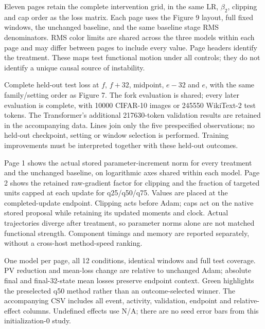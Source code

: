 \caption{Eleven pages retain the complete intervention grid, in the same LR, $\beta_2$, clipping and cap order as the loss matrix. Each page uses the Figure 9 layout, full fixed windows, the unchanged baseline, and the same baseline stage RMS denominators. RMS color limits are shared across the three models within each page and may differ between pages to include every value. Page headers identify the treatment. These maps test functional motion under all controls; they do not identify a unique causal source of instability.}

\caption{Complete held-out test loss at $f$, $f+32$, midpoint, $e-32$ and $e$, with the same family/setting order as Figure 7. The fork evaluation is shared; every later evaluation is complete, with 10000 CIFAR-10 images or 245550 WikiText-2 test tokens. The Transformer's additional 217630-token validation results are retained in the accompanying data. Lines join only the five prespecified observations; no held-out checkpoint, setting or window selection is performed. Training improvements must be interpreted together with these held-out outcomes.}

\caption{Page 1 shows the actual stored parameter-increment norm for every treatment and the unchanged baseline, on logarithmic axes shared within each model. Page 2 shows the retained raw-gradient factor for clipping and the fraction of targeted units capped at each update for q25/q50/q75. Values are placed at the completed-update endpoint. Clipping acts before Adam; caps act on the native stored proposal while retaining its updated moments and clock. Actual trajectories diverge after treatment, so parameter norms alone are not matched functional strength. Component timings and memory are reported separately, without a cross-host method-speed ranking.}

\caption{One model per page, all 12 conditions, identical windows and full test coverage. PV reduction and mean-loss change are relative to unchanged Adam; absolute final and final-32-state mean losses preserve endpoint context. Green highlights the preselected q50 method rather than an outcome-selected winner. The accompanying CSV includes all event, activity, validation, endpoint and relative-effect columns. Undefined effects use N/A; there are no seed error bars from this initialization-0 study.}

